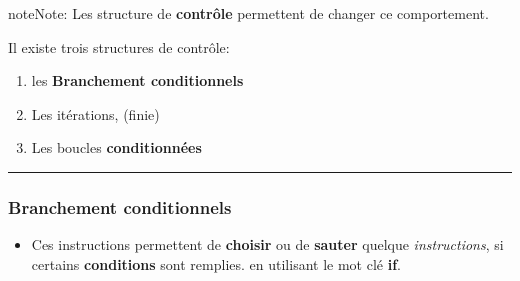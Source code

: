 \documentclass[letterpaper,10pt,english]{sphinxmanual}
\begin{document}
\begin{notice}{note}{Note:}
Les structure de \textbf{contrôle} permettent de changer ce comportement.
\end{notice}

Il existe trois structures de contrôle:
\begin{enumerate}
\item {} 
les \textbf{Branchement conditionnels}

\item {} 
Les itérations, (finie)

\item {} 
Les boucles \textbf{conditionnées}

\end{enumerate}


\bigskip\hrule{}\bigskip



\subsubsection{Branchement conditionnels}
\label{structures1:branchement-conditionnels}\begin{itemize}
\item {} 
Ces instructions permettent de \textbf{choisir} ou de \textbf{sauter} quelque \emph{instructions}, si certains \textbf{conditions} sont remplies. en utilisant le mot clé \textbf{if}.

\end{itemize}
\end{document}
